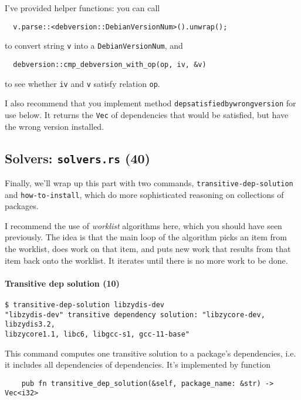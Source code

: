 \documentclass[12pt]{article}
\renewcommand{\_}{\kern-1.5pt\textunderscore\kern-1.5pt}
\begin{document}
\vspace{1em}
I've provided helper functions: you can call 
\begin{verbatim}
  v.parse::<debversion::DebianVersionNum>().unwrap();
\end{verbatim}
to convert string \texttt{v} into a \texttt{DebianVersionNum}, and 
\begin{verbatim}
  debversion::cmp_debversion_with_op(op, iv, &v)
\end{verbatim}
to see whether \texttt{iv} and \texttt{v} satisfy relation \texttt{op}.

\vspace{1em}
I also recommend that you implement method \texttt{dep\_satisfied\_by\_wrong\_version} for use below.
It returns the \texttt{Vec} of dependencies that would be satisfied, but have the wrong version installed.

\subsection*{Solvers: \texttt{solvers.rs} (40)}

Finally, we'll wrap up this part with two commands, \texttt{transitive-dep-solution} and \texttt{how-to-install},
which do more sophisticated reasoning on collections of packages.

\vspace{1em}
I recommend the use of \emph{worklist} algorithms here, which you should have seen previously.
The idea is that the main loop of the algorithm picks an item from the worklist, does work on that
item, and puts new work that results from that item back onto the worklist. It iterates until there
is no more work to be done.

\paragraph{Transitive dep solution (10)}
\begin{verbatim}
$ transitive-dep-solution libzydis-dev
"libzydis-dev" transitive dependency solution: "libzycore-dev, libzydis3.2, 
libzycore1.1, libc6, libgcc-s1, gcc-11-base"
\end{verbatim}
This command computes one transitive solution to a package's dependencies, i.e. it includes all 
dependencies of dependencies. It's implemented by function 

\begin{verbatim}
    pub fn transitive_dep_solution(&self, package_name: &str) -> Vec<i32>
\end{verbatim}
\end{document}
